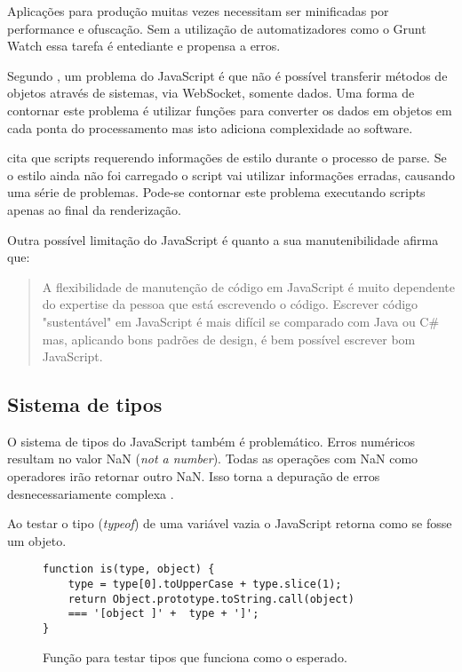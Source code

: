Aplicações para produção muitas vezes necessitam ser minificadas por
performance e ofuscação. Sem a utilização de automatizadores como o
Grunt Watch essa tarefa é entediante e propensa a erros.

Segundo \cite{htmlResearchJournal}, um problema do JavaScript é que
não é possível transferir métodos de objetos através de sistemas,
via WebSocket, somente dados. Uma forma de contornar este problema é
utilizar funções para converter os dados em objetos em cada ponta do
processamento mas isto adiciona complexidade ao software.

\cite{howBrowsersWork} cita que scripts requerendo informações de
estilo durante o processo de parse. Se o estilo ainda não foi carregado
o script vai utilizar informações erradas, causando uma série de
problemas. Pode-se contornar este problema executando scripts apenas 
ao final da renderização.


Outra possível limitação do JavaScript é quanto a sua manutenibilidade \cite{html5Tradeoffs} afirma que:
\begin{quote}
A flexibilidade de manutenção de código em JavaScript é muito
dependente do expertise da pessoa que está escrevendo o código.
Escrever código "sustentável" em JavaScript é mais difícil se
comparado com Java ou C\# mas, aplicando bons padrões de design, é bem
possível escrever bom JavaScript.
\end{quote}

\subsection{Sistema de tipos}

O sistema de tipos do JavaScript também é problemático.
Erros numéricos resultam no valor NaN (\textit{not a number}).
Todas as operações com NaN como operadores irão retornar outro
NaN. Isso torna a depuração de erros desnecessariamente complexa
\autocite{html5mostwanted}.

Ao testar o tipo (\textit{typeof}) de uma variável vazia o JavaScript
retorna como se fosse um objeto.

\begin{figure}[H]
\centering
\begin{verbatim}
function is(type, object) {
    type = type[0].toUpperCase + type.slice(1);
    return Object.prototype.toString.call(object)
    === '[object ]' +  type + ']';
}
\end{verbatim}
\caption{Função para testar tipos que funciona como o esperado.}
\label{fig:fixJSTypes}
\end{figure}

